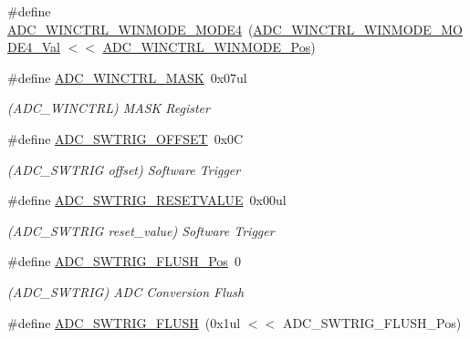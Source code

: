 \begin{DoxyCompactItemize}
\item 
\#define \mbox{\hyperlink{group___s_a_m_d21___a_d_c_ga87ef4c25a0def454244dfd569a1c08f4}{A\+D\+C\+\_\+\+W\+I\+N\+C\+T\+R\+L\+\_\+\+W\+I\+N\+M\+O\+D\+E\+\_\+\+M\+O\+D\+E4}}~(\mbox{\hyperlink{group___s_a_m_d21___a_d_c_ga6e13dd056a0a8aa65b6e3aefad8f2c21}{A\+D\+C\+\_\+\+W\+I\+N\+C\+T\+R\+L\+\_\+\+W\+I\+N\+M\+O\+D\+E\+\_\+\+M\+O\+D\+E4\+\_\+\+Val}} $<$$<$ \mbox{\hyperlink{group___s_a_m_d21___a_d_c_ga5c7a53123f9ec54b3295fc3850240fff}{A\+D\+C\+\_\+\+W\+I\+N\+C\+T\+R\+L\+\_\+\+W\+I\+N\+M\+O\+D\+E\+\_\+\+Pos}})
\item 
\#define \mbox{\hyperlink{group___s_a_m_d21___a_d_c_ga2dbd22d8c4a159eb6e90eb8f7e80bdcc}{A\+D\+C\+\_\+\+W\+I\+N\+C\+T\+R\+L\+\_\+\+M\+A\+SK}}~0x07ul
\begin{DoxyCompactList}\small\item\em (A\+D\+C\+\_\+\+W\+I\+N\+C\+T\+RL) M\+A\+SK Register \end{DoxyCompactList}\item 
\#define \mbox{\hyperlink{group___s_a_m_d21___a_d_c_ga31069581e8251f1eeffcb1933288b927}{A\+D\+C\+\_\+\+S\+W\+T\+R\+I\+G\+\_\+\+O\+F\+F\+S\+ET}}~0x0C
\begin{DoxyCompactList}\small\item\em (A\+D\+C\+\_\+\+S\+W\+T\+R\+IG offset) Software Trigger \end{DoxyCompactList}\item 
\#define \mbox{\hyperlink{group___s_a_m_d21___a_d_c_ga49c6b5f14c508b44648ebbd35407257a}{A\+D\+C\+\_\+\+S\+W\+T\+R\+I\+G\+\_\+\+R\+E\+S\+E\+T\+V\+A\+L\+UE}}~0x00ul
\begin{DoxyCompactList}\small\item\em (A\+D\+C\+\_\+\+S\+W\+T\+R\+IG reset\+\_\+value) Software Trigger \end{DoxyCompactList}\item 
\#define \mbox{\hyperlink{group___s_a_m_d21___a_d_c_ga5b316b5ec857239352dbb1c1701bacc2}{A\+D\+C\+\_\+\+S\+W\+T\+R\+I\+G\+\_\+\+F\+L\+U\+S\+H\+\_\+\+Pos}}~0
\begin{DoxyCompactList}\small\item\em (A\+D\+C\+\_\+\+S\+W\+T\+R\+IG) A\+DC Conversion Flush \end{DoxyCompactList}\item 
\#define \mbox{\hyperlink{group___s_a_m_d21___a_d_c_ga0fda4b567d2d9486ebd8ea6d2674f76c}{A\+D\+C\+\_\+\+S\+W\+T\+R\+I\+G\+\_\+\+F\+L\+U\+SH}}~(0x1ul $<$$<$ A\+D\+C\+\_\+\+S\+W\+T\+R\+I\+G\+\_\+\+F\+L\+U\+S\+H\+\_\+\+Pos)
\item 

\end{DoxyCompactItemize}
